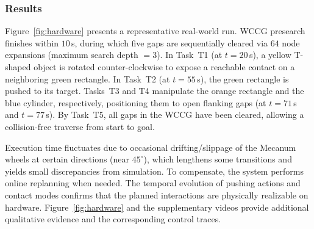 \subsubsection{Results}\label{subsec:exp-results}
Figure~\ref{fig:hardware} presents a representative real-world run.
WCCG presearch finishes within $10$\,s, during which five gaps are sequentially cleared via $64$ node expansions (maximum search depth $=3$).
In Task~T1 (at $t{=}20$\,s), a yellow T-shaped object is rotated counter-clockwise to expose a reachable contact on a neighboring green rectangle.
In Task~T2 (at $t{=}55$\,s), the green rectangle is pushed to its target.
Tasks~T3 and T4 manipulate the orange rectangle and the blue cylinder, respectively, positioning them to open flanking gaps (at $t{=}71$\,s and $t{=}77$\,s).
By Task~T5, all gaps in the WCCG have been cleared, allowing a collision-free traverse from start to goal.

Execution time fluctuates due to occasional drifting/slippage of the Mecanum wheels at certain directions (near $45^\circ$), which lengthens some transitions and yields small discrepancies from simulation.
To compensate, the system performs online replanning when needed.
The temporal evolution of pushing actions and contact modes confirms that the planned interactions are physically realizable on hardware.
Figure~\ref{fig:hardware} and the supplementary videos provide additional qualitative evidence and the corresponding control traces.


